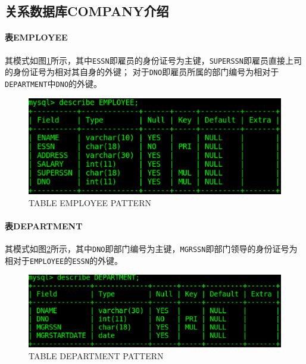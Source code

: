 \documentclass{ML}
\begin{document}
\subsection{关系数据库COMPANY介绍}
\paragraph{表EMPLOYEE} 其模式如图\ref{fig:emp_pattern}所示，其中\texttt{ESSN}即雇员的身份证号为主键，\texttt{SUPERSSN}即雇员直接上司的身份证号为相对其自身的外键；
对于\texttt{DNO}即雇员所属的部门编号为相对于\texttt{DEPARTMENT}中\texttt{DNO}的外键。
\begin{figure}[htb]
    \centering
    \includegraphics[scale = 0.5, bb=0 0 639 242]{media/employee_pattern.eps}
    \caption{TABLE EMPLOYEE PATTERN}\label{fig:emp_pattern}
\end{figure}
\paragraph{表DEPARTMENT} 其模式如图\ref{fig:dep_pattern}所示，其中\texttt{DNO}即部门编号为主键，\texttt{MGRSSN}即部门领导的身份证号为相对于\texttt{EMPLOYEE}的\texttt{ESSN}的外键。
\begin{figure}[htb]
    \centering
    \includegraphics[scale = 0.5, bb=0 0 682 196]{media/department_pattern.eps}
    \caption{TABLE DEPARTMENT PATTERN}\label{fig:dep_pattern}
\end{figure}
\end{document}
